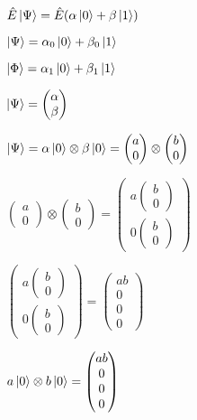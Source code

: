 \documentclass[multi=math, crop, convert]{standalone}
\begin{document}
\begin{math}
	\hat{E}\ket{\Psi} = \hat{E}(\alpha\ket{0} + \beta\ket{1}) 
\end{math}

\begin{math}
	\ket{\Psi} = \alpha_0\ket{0} + \beta_0\ket{1} 
\end{math}

\begin{math}
	\ket{\Phi} = \alpha_1\ket{0} + \beta_1\ket{1} 
\end{math}

\begin{math}
	\ket{\Psi} = \begin{pmatrix}
	\alpha \\
	\beta
\end{pmatrix}
\end{math}

\begin{math}
\ket{\Psi} = \alpha\ket{0} \otimes \beta\ket{0} = \begin{pmatrix}
	a \\
	0
\end{pmatrix}
\otimes
\begin{pmatrix}
	b \\
	0
\end{pmatrix}
\end{math}

\begin{math}
\begin{pmatrix}
	a \\
	0
\end{pmatrix}
\otimes
\begin{pmatrix}
	b \\
	0
\end{pmatrix}
=
\begin{pmatrix}
	a \begin{pmatrix}
		b \\
		0
	\end{pmatrix} \\
	0 \begin{pmatrix}
		b \\
		0
	\end{pmatrix}
\end{pmatrix}
\end{math}

\begin{math}
\begin{pmatrix}
	a \begin{pmatrix}
		b \\
		0
	\end{pmatrix} \\
	0 \begin{pmatrix}
		b \\
		0
	\end{pmatrix}
\end{pmatrix}
=
\begin{pmatrix}
		ab \\
		0 \\
		0 \\
		0
\end{pmatrix}
\end{math}

\begin{math}
a\ket{0} \otimes b\ket{0} =
\begin{pmatrix}
		ab \\
		0 \\
		0 \\
		0
\end{pmatrix}
\end{math}
\end{document}
